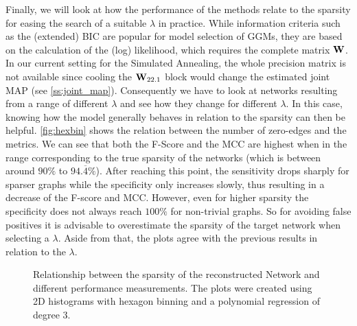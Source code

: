 Finally, we will look at how the performance of the methods relate to the sparsity for easing the search of a suitable $\lambda$ in practice.
While information criteria such as the (extended) BIC \citep{foygel2010extended} are popular for model selection of \gls{GGM}s, they are based on the calculation of the (log) likelihood, which requires the complete matrix $\mathbf{W}$.
In our current setting for the Simulated Annealing,
the whole precision matrix is not available since cooling the $\mathbf{W}_{22.1}$ block would change the estimated joint MAP (see \autoref{ss:joint_map}).
Consequently we have to look at networks resulting from a range of different $\lambda$ and see how they change for different $\lambda$.
In this case, knowing how the model generally behaves in relation to the sparsity can then be helpful.
\autoref{fig:hexbin} shows the relation between the number of zero-edges and the metrics.
We can see that both the F-Score and the MCC are highest when in the range corresponding to the true sparsity of the networks (which is between around $90\%$ to $94.\overline{4}\%$).
After reaching this point, the sensitivity drops sharply for sparser graphs while the specificity only increases slowly,
thus resulting in a decrease of the F-score and MCC.
However, even for higher sparsity the specificity does not always reach $100\%$ for non-trivial graphs.
So for avoiding false positives it is advisable to overestimate the sparsity of the target network when selecting a $\lambda$.
Aside from that, the plots agree with the previous results in relation to the $\lambda$.

\begin{figure}
	\centering
	\caption{Relationship between the sparsity of the reconstructed Network and different performance measurements.
		The plots were created using 2D histograms with hexagon binning and a polynomial regression of degree 3.}
	\label{fig:hexbin}
\end{figure}
\FloatBarrier

